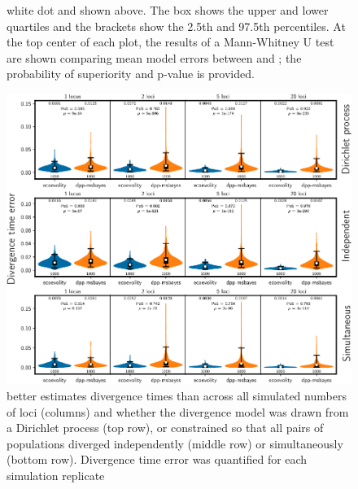 \documentclass[letterpaper,12pt]{article}
\begin{document}
\begin{figure}[htbp]
\begin{center}
{            white dot and shown above.
            The box shows the upper and lower quartiles and the brackets
            show the 2.5th and 97.5th percentiles.
            At the top center of each plot, the results of a Mann-Whitney U
            test \citep{MannWhitney1947} are shown comparing mean model errors
            between \ecoevolity and \dppmsbayes;
            the probability of superiority \citep[PoS, the probability that
            \ecoevolity has a lower mean model error than \dppmsbayes for a
            random simulation replicate drawn from
            each;][]{WolfeHogg1971,Grissom1994} and p-value is provided.
        }
        \label{fig:modelerror}
    \end{center}
\end{figure}

\begin{figure}[htbp]
    \begin{center}
        \includegraphics[width=\textwidth,height=\textheight,keepaspectratio]{../images/from-project-repo/plots/tex-plot-grids/grid-div-time-error-cropped.pdf}
        \caption{
            \Ecoevolity better estimates divergence times than \dppmsbayes
            across all simulated numbers of loci (columns) and whether the
            divergence model was drawn from a Dirichlet process (top row), or
            constrained so that all pairs of populations diverged independently
            (middle row) or simultaneously (bottom row).
            Divergence time error was quantified for each simulation replicate
}
\end{center}
\end{figure}
\end{document}
